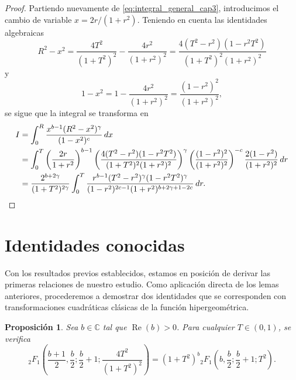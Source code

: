 \documentclass[12pt,a4paper]{book}
\newtheorem{prop}[theorem]{Proposición}
\begin{document}
\begin{proof}
Partiendo nuevamente de \eqref{eq:integral_general_cap3}, introducimos el cambio de variable $x = 2r/(1+r^2)$. Teniendo en cuenta las identidades algebraicas
\[
    R^2 - x^2 = \frac{4T^2}{(1+T^2)^2} - \frac{4r^2}{(1+r^2)^2} = \frac{4(T^2 - r^2)(1 - r^2T^2)}{(1+T^2)^2(1+r^2)^2}
\]
y
\[
    1 - x^2 = 1 - \frac{4r^2}{(1+r^2)^2} = \frac{(1-r^2)^2}{(1+r^2)^2},
\]
se sigue que la integral se transforma en
\begin{align*}
    I &= \int_{0}^{R} \frac{x^{b-1} (R^2 - x^2)^\gamma}{(1 - x^2)^c} \, dx \\
    &= \int_{0}^{T} \left( \frac{2r}{1+r^2} \right)^{b-1} \left( \frac{4(T^2 - r^2)(1 - r^2T^2)}{(1+T^2)^2(1+r^2)^2} \right)^\gamma \left( \frac{(1-r^2)^2}{(1+r^2)^2} \right)^{-c} \frac{2(1-r^2)}{(1+r^2)^2}  \, dr \\
    &= \frac{2^{b+2\gamma}}{(1+T^2)^{2\gamma}} \int_{0}^{T} \frac{r^{b-1} (T^2-r^2)^\gamma  (1-r^2T^2)^\gamma}{(1-r^2)^{2c-1}(1+r^2)^{b+2\gamma+1-2c}} \, dr. \qedhere
\end{align*}
\end{proof}

\section{Identidades conocidas}

Con los resultados previos establecidos, estamos en posición de derivar las primeras relaciones de nuestro estudio. Como aplicación directa de los lemas anteriores, procederemos a demostrar dos identidades que se corresponden con transformaciones cuadráticas clásicas de la función hipergeométrica.

\begin{prop}
\label{prop:identidad_1}
Sea $b \in \mathbb{C}$ tal que $\operatorname{Re}(b) > 0$. Para cualquier $T \in (0, 1)$, se verifica
\[
    {}_{2}F_{1}\left(\frac{b+1}{2}, \frac{b}{2}; \frac{b}{2}+1; \frac{4T^2}{(1+T^2)^2}\right) = (1+T^2)^b {}_{2}F_{1}\left(b, \frac{b}{2}; \frac{b}{2}+1; T^2\right).
\]
\end{prop}
\end{document}
